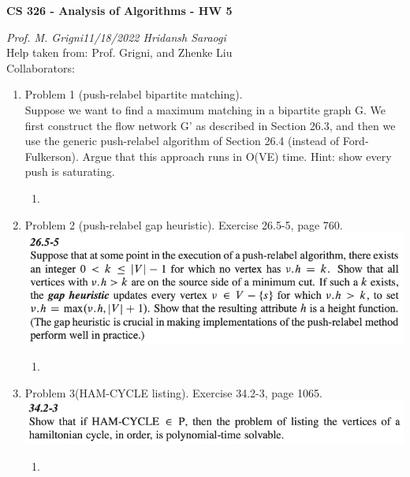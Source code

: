 \documentclass[11pt]{article}
\begin{document}
\begin{center}
    \textbf{CS 326 - Analysis of Algorithms - HW 5}\\
\end{center}


\begin{flushleft}
    \textit{Prof. M. Grigni\hfill11/18/2022 \hfill Hridansh Saraogi} \\
    \vspace{0.15cm}
    \small {Help taken from: Prof. Grigni, and Zhenke Liu}\\
    \small {Collaborators: }
\end{flushleft}


\begin{enumerate}

\item Problem 1 (push-relabel bipartite matching). \\
Suppose we want to find a maximum matching in a bipartite graph G. We first construct the flow network G' as described in Section 26.3, and then we use the generic push-relabel algorithm of Section 26.4 (instead of Ford-Fulkerson). Argue that this approach runs in O(VE) time.  Hint: show every push is saturating.
    \begin{enumerate}
        \item 
    \end{enumerate}

\pagebreak

\item Problem 2 (push-relabel gap heuristic). Exercise 26.5-5, page 760.\\
\includegraphics[scale=1]{HW5_Q2.png}
    \begin{enumerate}
        \item 
    \end{enumerate}
    
\pagebreak

\item Problem 3(HAM-CYCLE listing). Exercise 34.2-3, page 1065.\\
\includegraphics[scale=1]{HW5_Q3.png}
    \begin{enumerate}
        \item 
        

\end{enumerate}
\end{enumerate}
\end{document}
